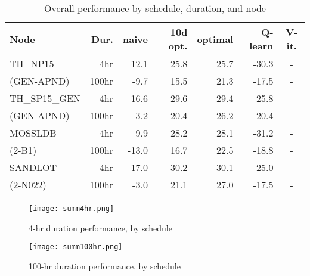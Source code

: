 \documentclass[conference]{IEEEtran}
\begin{document}
\begin{table}[htbp]
    \caption{\label{tab:summary} Overall performance by schedule, duration, and node}
    \begin{center}
        \begin{tabular}{lrrrrrc}
            \toprule
             \textbf{Node} & \textbf{Dur.} &  \textbf{naive} &  \textbf{10d opt.} &  \textbf{optimal} &  \textbf{Q-learn} & \textbf{V-it.} \\
            \midrule
            TH\_NP15         & 4hr &   12.1 &              25.8 &     25.7 &  -30.3 &     - \\
            (GEN-APND)       & 100hr &   -9.7 &              15.5 &     21.3 &  -17.5 &     - \\
            TH\_SP15\_GEN    & 4hr &   16.6 &              29.6 &     29.4 &  -25.8 &     - \\
            (GEN-APND)       & 100hr &   -3.2 &              20.4 &     26.2 &  -20.4 &     - \\
            MOSSLDB          & 4hr &    9.9 &              28.2 &     28.1 &  -31.2 &     - \\
             (2-B1)          & 100hr &  -13.0 &              16.7 &     22.5 &  -18.8 &     - \\
            SANDLOT          & 4hr &   17.0 &              30.2 &     30.1 &  -25.0 &     - \\
             (2-N022)        & 100hr &   -3.0 &              21.1 &     27.0 &  -17.5 &     - \\
            \bottomrule
            \end{tabular}
    \end{center}
\end{table}

\begin{figure}[htbp]
    \caption{\label{fig:summ4} 4-hr duration performance, by schedule}
\centerline{\texttt{[image: summ4hr.png]}}
\end{figure}

\begin{figure}[htbp]
    \caption{\label{fig:summ100} 100-hr duration performance, by schedule}
\centerline{\texttt{[image: summ100hr.png]}}
\end{figure}
\end{document}
